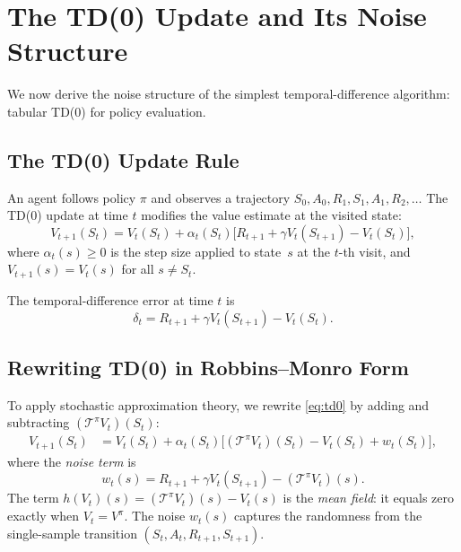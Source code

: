 \documentclass[11pt,a4paper]{article}
\begin{document}

\section{The TD(0) Update and Its Noise Structure}
\label{sec:td_noise}

We now derive the noise structure of the simplest
temporal-difference algorithm: tabular TD(0) for policy evaluation.

\subsection{The TD(0) Update Rule}

An agent follows policy $\pi$ and observes a trajectory
$S_0, A_0, R_1, S_1, A_1, R_2, \ldots$  The TD(0) update at
time $t$ modifies the value estimate at the visited state:
\begin{equation}
  V_{t+1}(S_t)
  = V_t(S_t) + \alpha_t(S_t)
    \bigl[R_{t+1} + \gamma V_t(S_{t+1}) - V_t(S_t)\bigr],
  \label{eq:td0}
\end{equation}
where $\alpha_t(s) \geq 0$ is the step size applied to state~$s$
at the $t$-th visit, and $V_{t+1}(s) = V_t(s)$ for all
$s \neq S_t$.

\begin{definition}[TD Error]
\label{def:td_error}
The temporal-difference error at time $t$ is
\begin{equation}
  \delta_t
  = R_{t+1} + \gamma V_t(S_{t+1}) - V_t(S_t).
  \label{eq:td_error}
\end{equation}
\end{definition}

\subsection{Rewriting TD(0) in Robbins--Monro Form}

To apply stochastic approximation theory, we rewrite
\eqref{eq:td0} by adding and subtracting
$(\mathcal{T}^\pi V_t)(S_t)$:
\begin{align}
  V_{t+1}(S_t)
  &= V_t(S_t) + \alpha_t(S_t)
    \bigl[(\mathcal{T}^\pi V_t)(S_t) - V_t(S_t) + w_t(S_t)
    \bigr],
  \label{eq:td_rm}
\end{align}
where the \emph{noise term} is
\begin{equation}
  w_t(s)
  = R_{t+1} + \gamma V_t(S_{t+1})
    - (\mathcal{T}^\pi V_t)(s).
  \label{eq:noise_def}
\end{equation}
The term $h(V_t)(s) = (\mathcal{T}^\pi V_t)(s) - V_t(s)$ is
the \emph{mean field}: it equals zero exactly when
$V_t = V^\pi$.  The noise $w_t(s)$ captures the randomness
from the single-sample transition $(S_t, A_t, R_{t+1}, S_{t+1})$.
\end{document}
